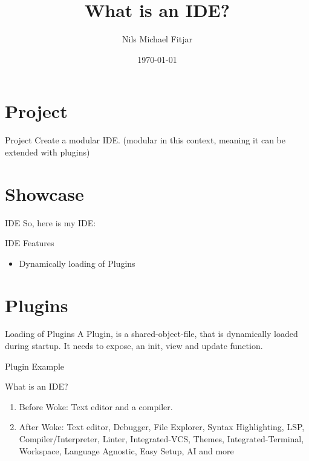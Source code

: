 \documentclass[UKenglish]{beamer}
\title{What is an IDE?}
\author{Nils Michael Fitjar}
\date{\today}
\begin{document}
\frame{\titlepage}

\section{Project}
\begin{frame}{Project}
  Create a modular IDE.
  (modular in this context, meaning it can be extended with plugins)
\end{frame}

\section{Showcase}
\begin{frame}{IDE}
  So, here is my IDE:
\end{frame}

\begin{frame}{IDE Features}
  \begin{itemize}
    \item Dynamically loading of Plugins
  \end{itemize}
\end{frame}

\section{Plugins}
\begin{frame}{Loading of Plugins}
  A Plugin, is a shared-object-file, that is dynamically loaded
  during startup.
  It needs to expose, an init, view and update function.
\end{frame}

\begin{frame}{Plugin Example}
  
\end{frame}

\begin{frame}{What is an IDE?}
  \begin{enumerate}
    \item Before Woke: Text editor and a compiler.
    \item After Woke: Text editor, Debugger, File Explorer,
    Syntax Highlighting, LSP, Compiler/Interpreter, Linter, Integrated-VCS,
    Themes, Integrated-Terminal, Workspace, Language Agnostic, Easy Setup, AI
    and more
  \end{enumerate}
\end{frame}
\end{document}
